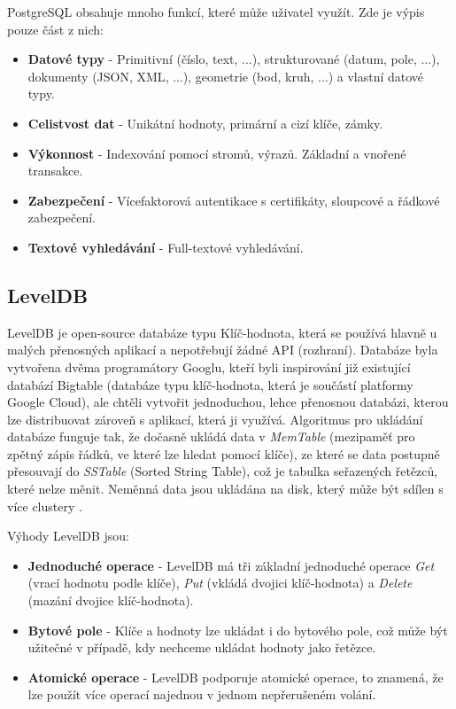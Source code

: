 \noindent PostgreSQL obsahuje mnoho funkcí, které může uživatel využít. Zde je výpis pouze část z nich:
\begin{itemize}
\item \textbf{Datové typy} - Primitivní (číslo, text, ...),  strukturované (datum, pole, ...), dokumenty (\gls{JSON}, \gls{XML}, ...), geometrie (bod, kruh, ...) a vlastní datové typy.
\item \textbf{Celistvost dat} - Unikátní hodnoty, primární a cizí klíče, zámky.
\item \textbf{Výkonnost} - Indexování pomocí stromů, výrazů. Základní a vnořené transakce.
\item \textbf{Zabezpečení} - Vícefaktorová autentikace s certifikáty, sloupcové a řádkové zabezpečení.
\item \textbf{Textové vyhledávání} - Full-textové vyhledávání.
\end{itemize}

\subsection{LevelDB}
LevelDB je open-source databáze typu Klíč-hodnota, která se používá hlavně u malých přenosných aplikací a nepotřebují žádné \gls{API} (rozhraní). Databáze byla vytvořena dvěma programátory Googlu, kteří byli inspirování již existující databází Bigtable (databáze typu klíč-hodnota, která je součástí platformy Google Cloud), ale chtěli vytvořit jednoduchou, lehce přenosnou databázi, kterou lze distribuovat zároveň s aplikací, která ji využívá.
\newline
\indent Algoritmus pro ukládání databáze funguje tak, že dočasně ukládá data v \textit{MemTable} (mezipaměť pro zpětný zápis řádků, ve které lze hledat pomocí klíče), ze které se data postupně přesouvají do \textit{SSTable} (Sorted String Table), což je tabulka seřazených řetězců, které nelze měnit. Neměnná data jsou ukládána na disk, který může být sdílen s více clustery \cite{leveldb}.
\newline

\noindent Výhody LevelDB jsou:
\begin{itemize}
\item \textbf{Jednoduché operace} - LevelDB má tři základní jednoduché operace \textit{Get} (vrací hodnotu podle klíče), \textit{Put} (vkládá dvojici klíč-hodnota) a \textit{Delete} (mazání dvojice klíč-hodnota).
\item \textbf{Bytové pole} - Klíče a hodnoty lze ukládat i do bytového pole, což může být užitečné v případě, kdy nechceme ukládat hodnoty jako řetězce.
\item \textbf{Atomické operace} - LevelDB podporuje atomické operace, to znamená, že lze použít více operací najednou v jednom nepřerušeném volání.
\end{itemize}

